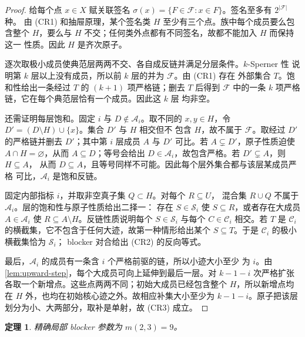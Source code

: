 \documentclass[UTF8,11pt,a4paper,fontset=fandol]{ctexart}
\newtheorem{theorem}{定理}[section]
\theoremstyle{definition}
\theoremstyle{remark}
\newcommand{\family}{\mathcal{F}}
\begin{document}
\begin{proof}
给每个点 $x\in X$ 赋关联签名
$\sigma(x)=\{F\in\family:x\in F\}$。签名至多有 $2^{|\family|}$ 种。
由 (CR1) 和抽屉原理，某个签名类 $H$ 至少有三个点。族中每个成员要么包含整个
$H$，要么与 $H$ 不交；任何类外点都有不同签名，故都不能加入 $H$ 而保持这一
性质。因此 $H$ 是齐次原子。

逐次取极小成员使典范层两两不交、各自成反链并满足分层条件。$k$-Sperner 性
说明第 $k$ 层以上没有成员，所以前 $k$ 层的并为 $\family$。由 (CR1) 存在
外部集合 $T$。饱和性给出一条经过 $T$ 的 $(k+1)$ 项严格链；删去 $T$ 后得到
$\family$ 中的一条 $k$ 项严格链，它在每个典范层恰有一个成员。因此这 $k$ 层
均非空。

还需证明每层饱和。固定 $i$ 与 $D\notin\mathcal A_i$。取不同的
$x,y\in H$，令 $D'=(D\setminus H)\cup\{x\}$。集合 $D'$ 与 $H$ 相交但不
包含 $H$，故不属于 $\family$。取经过 $D'$ 的严格链并删去 $D'$；其中第 $i$
层成员 $A$ 与 $D'$ 可比。若 $A\subsetneq D'$，原子性质迫使
$A\cap H=\varnothing$，从而 $A\subseteq D$；等号会给出
$D\in\mathcal A_i$，故包含严格。若 $D'\subsetneq A$，则 $H\subseteq A$，
从而 $D\subseteq A$，且等号同样不可能。因此每个层外集合都与该层某成员严格
可比，$\mathcal A_i$ 是饱和反链。

固定内部指标 $i$，并取非空真子集 $Q\subset H$。对每个 $R\subseteq U$，
混合集 $R\cup Q$ 不属于 $\mathcal A_i$。层的饱和性与原子性质给出二择一：
存在 $S\in\mathcal S_i$ 使 $S\subseteq R$，或者存在大成员
$A\in\mathcal A_i$ 使 $R\subseteq A\setminus H$。反链性质说明每个
$S\in\mathcal S_i$ 与每个 $C\in\mathcal C_i$ 相交。若 $T$ 是
$\mathcal C_i$ 的横截集，它不包含于任何大迹，故第一种情形给出某个
$S\subseteq T$。于是 $\mathcal C_i$ 的极小横截集恰为 $\mathcal S_i$；
blocker 对合给出 (CR2) 的反向等式。

最后，$\mathcal A_i$ 的成员有一条含 $i$ 个严格前驱的链，所以小迹大小至少
为 $i$。由\cref{lem:upward-step}，每个大成员可向上延伸到最后一层。对
$k-1-i$ 次严格扩张各取一个新增点。这些点两两不同；初始大成员已经包含整个
$H$，所以新增点均在 $H$ 外，也均在初始核心迹之外。故相应补集大小至少为
$k-1-i$。原子把该层划分为小、大两部分，取补是单射，故 (CR3) 成立。
\end{proof}

\begin{theorem}
\label{thm:m23}
精确局部 blocker 参数为 $m(2,3)=9$。
\end{theorem}
\end{document}
